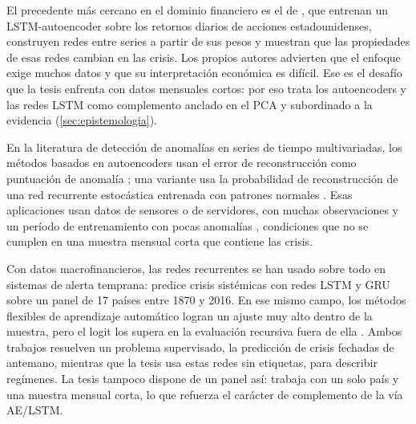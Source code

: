 El precedente más cercano en el dominio financiero es el de
\textcite{tuhin_et_al_2025}, que
entrenan un LSTM-autoencoder sobre los retornos diarios de acciones estadounidenses, construyen
redes entre series a partir de sus pesos y muestran que las propiedades de esas redes cambian en
las crisis. Los propios autores advierten que el enfoque exige muchos datos y que su
interpretación económica es difícil. Ese es el desafío que la tesis enfrenta con datos mensuales
cortos: por eso trata los autoencoders y las redes LSTM como complemento anclado en el PCA y
subordinado a la evidencia (\cref{sec:epistemologia}).

En la literatura de detección de anomalías en series de tiempo multivariadas, los métodos basados
en autoencoders usan el error de reconstrucción como puntuación de anomalía
\parencite[sec.~3.2]{audibert_et_al_2020}; una variante usa la probabilidad de reconstrucción
de una red recurrente estocástica entrenada con patrones normales
\parencite{su_et_al_2019}. Esas aplicaciones usan datos de sensores o de servidores, con muchas observaciones y un
período de entrenamiento con pocas anomalías \parencite[sec.~3.3 y~5.2]{audibert_et_al_2020},
condiciones que no se cumplen en una muestra mensual corta que contiene las crisis.

Con datos macrofinancieros, las redes recurrentes se han usado sobre todo en sistemas de alerta
temprana: \textcite{tolo_2020} predice crisis sistémicas con redes LSTM y GRU sobre un panel de 17 países entre
1870 y 2016. En ese mismo campo, los métodos flexibles de aprendizaje automático logran un ajuste
muy alto dentro de la muestra, pero el logit los supera en la evaluación recursiva fuera de ella
\parencite{beutel_list_von_schweinitz_2019}. Ambos trabajos resuelven un problema
supervisado, la predicción de crisis fechadas de antemano, mientras que la tesis usa estas redes
sin etiquetas, para describir regímenes. La tesis tampoco dispone de un panel así: trabaja con un
solo país y una muestra mensual corta, lo que refuerza el carácter de complemento de la vía
AE/LSTM.


